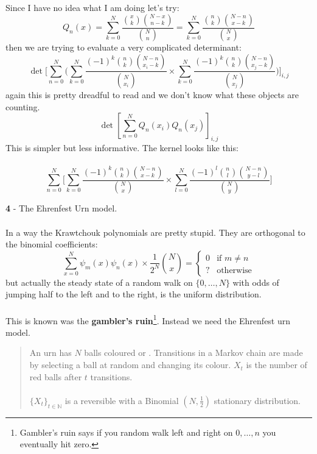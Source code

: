\documentclass[12pt]{article}
\begin{document}
\newpage

\noindent Since I have no idea what I am doing let's try:
$$ Q_n(x) = \sum_{k = 0}^N \frac{\binom{x}{k}\binom{N-x}{n-k}}{\binom{N}{n}}
= \sum_{k = 0}^N \frac{\binom{n}{k}\binom{N-n}{x-k}}{\binom{N}{x}} $$
then we are trying to evaluate a very complicated determinant:
$$ \det \Bigg[ 
\sum_{n=0}^N \bigg(
\sum_{k = 0}^N \frac{(-1)^k\binom{n}{k}\binom{N-n}{x_i-k}}{\binom{N}{x_i}} \times 
\sum_{k = 0}^N \frac{(-1)^k\binom{n}{k}\binom{N-n}{x_j-k}}{\binom{N}{x_j}}\bigg)
\Bigg]_{i,j} $$
again this is pretty dreadful to read and we don't know what these objects are counting.
$$ \det \left[ \sum_{n=0}^N Q_n(x_i) Q_n(x_j)\right]_{i,j}$$
This is simpler but less informative. The kernel looks like this:\\ \\ 
$$ 
\sum_{n=0}^N \bigg[ \sum_{k = 0}^N \frac{(-1)^k\binom{n}{k}\binom{N-n}{x-k}}{\binom{N}{x}} \times 
\sum_{l = 0}^N \frac{(-1)^l\binom{n}{l}\binom{N-n}{y-l}}{\binom{N}{y}}\bigg] $$  

\newpage

\noindent \textbf{4} - The Ehrenfest Urn model.  \\ \\
In a way the Krawtchouk polynomials are pretty stupid.  They are orthogonal to the binomial coefficients:
$$ \sum_{x=0}^N \psi_m(x) \psi_n(x) \times \frac{1}{2^N} \binom{N}{x} = \left\{
\begin{array}{cl} 0 & \text{if }m \neq n \\
? & \text{otherwise}\end{array}
 \right.$$
but actually the steady state of a random walk on $\{ 0, \dots, N\}$ with odds of jumping half to the left and to the right, is the uniform distribution.  \\ \\
This is known was the \textbf{gambler's ruin}\footnote{Gambler's ruin says if you random walk left and right on $0, \dots, n$ you eventually hit zero.}.  Instead we need the Ehrenfest urn model.  

\begin{quotation}
An urn has $N$ balls coloured {\color{red}{red}} or {\color{blue}{blue}}. Transitions in a Markov chain
are made by selecting a ball at random and changing its colour. $X_t$
is the
number of red balls after $t$ transitions. \\ \\ $\{X_t\}_{t \in \mathbb{N}}$ is a reversible {}
with a Binomial $(N, \frac{1}{2})$ stationary distribution. \end{quotation}
\end{document}
